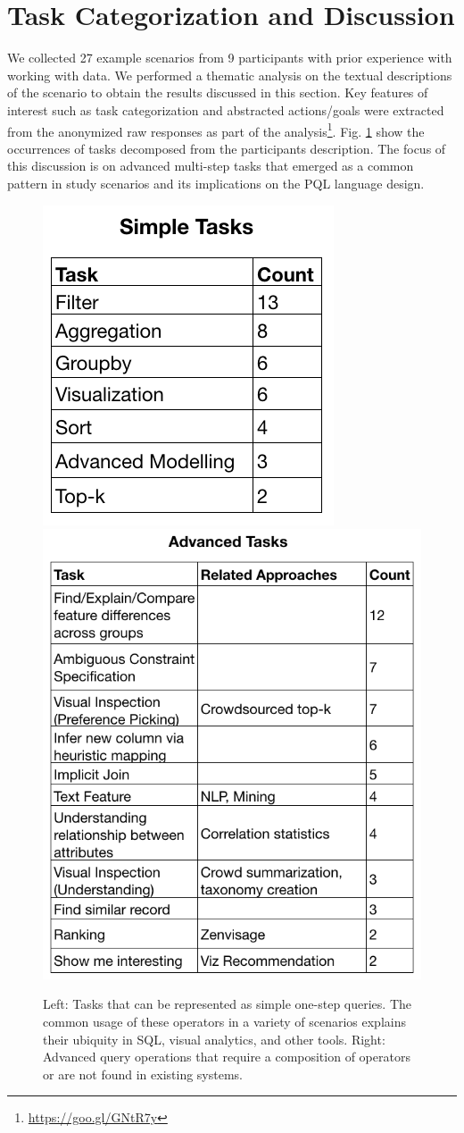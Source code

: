 \documentclass{sig-alternate-05-2015}
\begin{document}
\section{Task Categorization and Discussion}
\par We collected 27 example scenarios from 9 participants with prior experience with working with data. We performed a thematic analysis on the textual descriptions of the scenario to obtain the results discussed in this section. Key features of interest such as task categorization and abstracted actions/goals were extracted from the anonymized raw responses as part of the analysis\footnote{\url{https://goo.gl/GNtR7y}}.
Fig. \ref{tasks} show the occurrences of tasks decomposed from the participants description. The focus of this discussion is on advanced multi-step tasks that emerged as a common pattern in study scenarios and its implications on the PQL language design.
\begin{figure}[ht!]\label{tasks}
\includegraphics[width=0.4\linewidth]{figures/supported_tasks.png}
\includegraphics[width=0.6\linewidth]{figures/advanced_tasks.png}
\caption{Left: Tasks that can be represented as simple one-step queries. The common usage of these operators in a variety of scenarios explains their ubiquity in 
SQL, visual analytics, and other tools. Right: Advanced query operations that require a composition of operators or are not found in existing systems.}
\end{figure}
\end{document}
